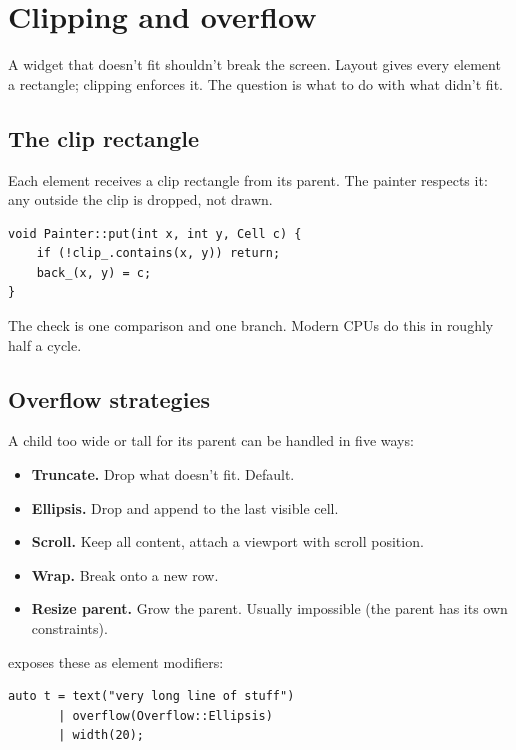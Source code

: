 \chapter{Clipping and overflow}
\label{ch:clipping}

\begin{aside}
A widget that doesn't fit shouldn't break the screen. Layout
gives every element a rectangle; clipping enforces it. The
question is what to do with what didn't fit.
\end{aside}

\section{The clip rectangle}

Each element receives a clip rectangle from its parent. The
painter respects it: any  outside the
clip is dropped, not drawn.

\begin{lstlisting}
void Painter::put(int x, int y, Cell c) {
    if (!clip_.contains(x, y)) return;
    back_(x, y) = c;
}
\end{lstlisting}

The check is one comparison and one branch. Modern CPUs do
this in roughly half a cycle.

\section{Overflow strategies}

A child too wide or tall for its parent can be handled in
five ways:

\begin{itemize}[leftmargin=*]
  \item \textbf{Truncate.} Drop what doesn't fit. Default.
  \item \textbf{Ellipsis.} Drop and append  to the
    last visible cell.
  \item \textbf{Scroll.} Keep all content, attach a viewport
    with scroll position.
  \item \textbf{Wrap.} Break onto a new row.
  \item \textbf{Resize parent.} Grow the parent. Usually
    impossible (the parent has its own constraints).
\end{itemize}

\maya{} exposes these as element modifiers:

\begin{lstlisting}
auto t = text("very long line of stuff")
       | overflow(Overflow::Ellipsis)
       | width(20);
\end{lstlisting}


